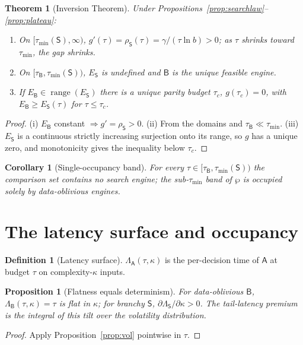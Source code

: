 \documentclass[11pt,oneside]{book}
\theoremstyle{definition}
\newtheorem{definition}{Definition}[chapter]
\theoremstyle{plain}
\newtheorem{theorem}{Theorem}[chapter]
\newtheorem{proposition}{Proposition}[chapter]
\newtheorem{corollary}{Corollary}[chapter]
\theoremstyle{remark}
\newcommand{\Elo}{E}
\newcommand{\Engine}{\mathsf{A}}
\newcommand{\Search}{\mathsf{S}}
\newcommand{\Branchless}{\mathsf{B}}
\newcommand{\budget}{\tau}
\newcommand{\kvol}{\kappa}
\newcommand{\skill}{\rho}
\begin{document}
\begin{theorem}[Inversion Theorem]\label{thm:inversion}
Under Propositions~\ref{prop:searchlaw}--\ref{prop:plateau}:
\begin{enumerate}[label=(\roman*),leftmargin=2.2em]
  \item On $[\budget_{\min}(\Search),\infty)$, $g'(\budget)=\skill_\Search(\budget)=
        \gamma/(\budget\ln b)>0$; as $\budget$ shrinks toward $\budget_{\min}$, the gap shrinks.
  \item On $[\budget_\Branchless,\budget_{\min}(\Search))$, $\Elo_\Search$ is undefined and
        $\Branchless$ is the unique feasible engine.
  \item If $\Elo_\Branchless\in\operatorname{range}(\Elo_\Search)$ there is a unique parity
        budget $\budget_c$, $g(\budget_c)=0$, with
        $\Elo_\Branchless\ge\Elo_\Search(\budget)$ for $\budget\le\budget_c$.
\end{enumerate}
\end{theorem}
\begin{proof}
(i) $\Elo_\Branchless$ constant $\Rightarrow g'=\skill_\Search>0$. (ii) From the domains and
$\budget_\Branchless\ll\budget_{\min}$. (iii) $\Elo_\Search$ is a continuous strictly
increasing surjection onto its range, so $g$ has a unique zero, and monotonicity gives the
inequality below $\budget_c$.
\end{proof}

\begin{corollary}[Single-occupancy band]\label{cor:empty}
For every $\budget\in[\budget_\Branchless,\budget_{\min}(\Search))$ the comparison set
contains no search engine; the sub-$\budget_{\min}$ band of $\wp$ is occupied solely by
data-oblivious engines.
\end{corollary}

\section{The latency surface and occupancy}
\begin{definition}[Latency surface]
$\Lambda_\Engine(\budget,\kvol)$ is the per-decision time of $\Engine$ at budget $\budget$
on complexity-$\kvol$ inputs.
\end{definition}

\begin{proposition}[Flatness equals determinism]\label{prop:flat}
For data-oblivious $\Branchless$, $\Lambda_\Branchless(\budget,\kvol)=\budget$ is flat in
$\kvol$; for branchy $\Search$, $\partial\Lambda_\Search/\partial\kvol>0$. The tail-latency
premium is the integral of this tilt over the volatility distribution.
\end{proposition}
\begin{proof}
Apply Proposition~\ref{prop:vol} pointwise in $\budget$.
\end{proof}
\end{document}
